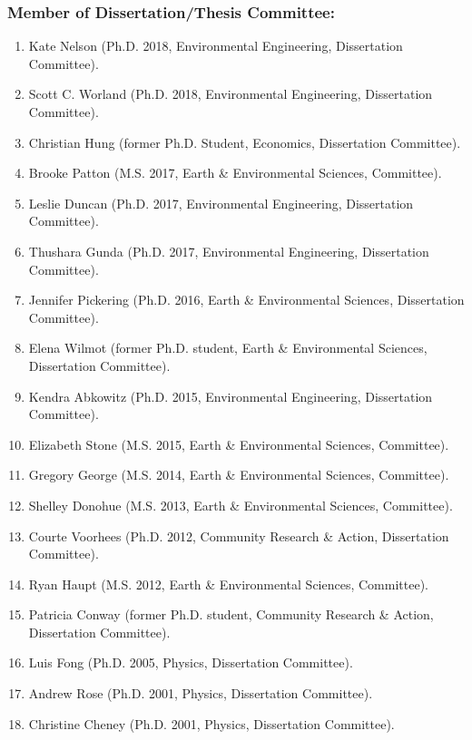 \documentclass[10pt]{article}
\begin{document}
    \subsubsection{Member of Dissertation/Thesis Committee:}
    \begin{enumerate}
    \item Kate Nelson (Ph.D. 2018, Environmental Engineering, Dissertation Committee).
    \item Scott C. Worland (Ph.D. 2018, Environmental Engineering, Dissertation Committee).
    \item Christian Hung (former Ph.D. Student, Economics, Dissertation Committee).
    \item Brooke Patton (M.S. 2017, Earth \& Environmental Sciences, Committee).
    \item Leslie Duncan (Ph.D. 2017, Environmental Engineering, Dissertation Committee).
    \item Thushara Gunda (Ph.D. 2017, Environmental Engineering, Dissertation Committee).
    \item Jennifer Pickering (Ph.D. 2016, Earth \& Environmental Sciences, Dissertation Committee).
    \item Elena Wilmot (former Ph.D. student, Earth \& Environmental Sciences, Dissertation Committee).
    \item Kendra Abkowitz (Ph.D. 2015, Environmental Engineering, Dissertation Committee).
    \item Elizabeth Stone (M.S. 2015, Earth \& Environmental Sciences, Committee).
    \item Gregory George (M.S. 2014, Earth \& Environmental Sciences, Committee).
    \item Shelley Donohue (M.S. 2013, Earth \& Environmental Sciences, Committee).
    \item Courte Voorhees (Ph.D. 2012,  Community Research \& Action, Dissertation Committee).
    \item Ryan Haupt (M.S. 2012, Earth \& Environmental Sciences, Committee).
    \item Patricia Conway (former Ph.D. student, Community Research \& Action, Dissertation Committee).
    \item Luis Fong (Ph.D. 2005, Physics, Dissertation Committee).
    \item Andrew Rose (Ph.D. 2001, Physics, Dissertation Committee).
    \item Christine Cheney (Ph.D. 2001, Physics, Dissertation Committee).
	\end{enumerate}
\end{document}
